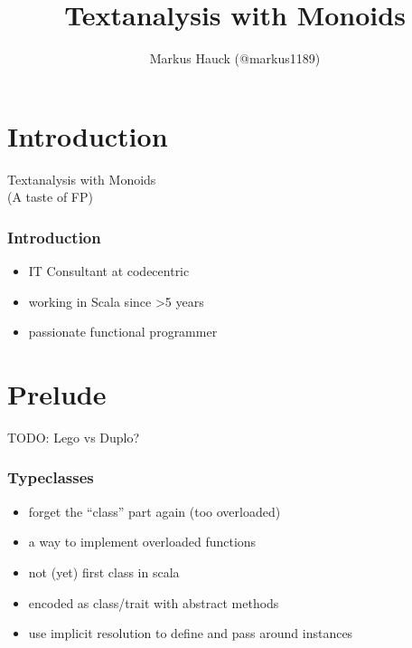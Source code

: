 \documentclass[aspectratio=169]{beamer}
\title{Textanalysis with Monoids}
\author{Markus Hauck (@markus1189)}
\begin{document}
\begin{frame}
  \titlepage{}
\end{frame}

\section{Introduction}\label{sec:introduction}

\begin{frame}
  \begin{center}
    {\Huge Textanalysis with Monoids\\}
    (A taste of FP)
  \end{center}
\end{frame}

\begin{frame}
  \frametitle{Introduction}
  \begin{itemize}
  \item IT Consultant at codecentric
  \item working in Scala since >5 years
  \item passionate functional programmer
  \end{itemize}
\end{frame}

\section{Prelude}\label{sec:prelude}

\begin{frame}
  TODO: Lego vs Duplo?
\end{frame}


\begin{frame}
  \frametitle{Typeclasses}
  \begin{itemize}
  \item forget the ``class'' part again (too overloaded)
  \item a way to implement overloaded functions
  \item not (yet) first class in scala
  \item encoded as class/trait with abstract methods
  \item use implicit resolution to define and pass around instances
  \end{itemize}
\end{frame}
\end{document}
